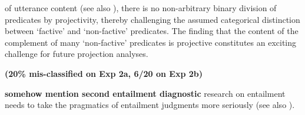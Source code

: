 \documentclass[12pt,fleqn]{article}
\newcommand{\6}{\mbox{$[\hspace*{-.6mm}[$}}
\newcommand{\9}{\mbox{$]\hspace*{-.6mm}]$}}
\begin{document}
\noindent
of utterance content (see also \cite{tbd-variability}), there is no non-arbitrary binary division of predicates by projectivity, thereby challenging the assumed categorical distinction between `factive' and `non-factive' predicates. The finding that the content of the complement of many `non-factive' predicates is projective constitutes an exciting challenge for future projection analyses.

{\bf (20\% mis-classified on Exp 2a, 6/20 on Exp 2b)}

{\bf somehow mention second entailment diagnostic} research on entailment needs to take the pragmatics of entailment judgments more seriously (see also \cite{demarneffe-etal2012}). 



%
%
%

\newpage


\end{document}
